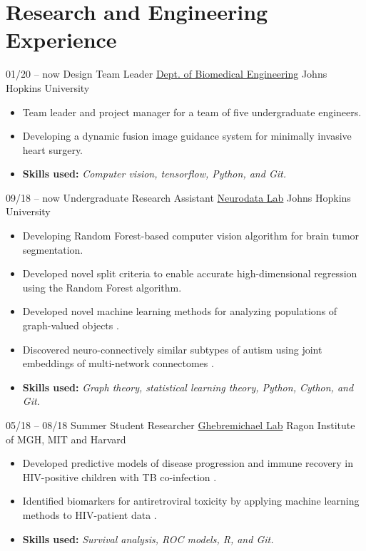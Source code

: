 \section{Research and Engineering Experience}
\cventry
{01/20 -- now}
{Design Team Leader}
{\href{https://cbid.bme.jhu.edu/academics/undergraduate-studies/}{Dept. of Biomedical Engineering}}
{Johns Hopkins University}
{}
{
\begin{itemize}
    \item Team leader and project manager for a team of five undergraduate engineers.
    \item Developing a dynamic fusion image guidance system for minimally invasive heart surgery.
    \item \textbf{Skills used:} \textit{Computer vision, tensorflow, Python, and Git.}
\end{itemize}{}
}

\cventry
{09/18 -- now}
{Undergraduate Research Assistant}
{\href{https://neurodata.io}{Neurodata Lab}}
{Johns Hopkins University}
{}
{
\begin{itemize}
    \item Developing Random Forest-based computer vision algorithm for brain tumor segmentation.
    \item Developed novel split criteria to enable accurate high-dimensional regression using the Random Forest algorithm.
    \item Developed novel machine learning methods for analyzing populations of graph-valued objects \cite{chungStatisticalConnectomics2020b}.
    \item Discovered neuro-connectively similar subtypes of autism using joint embeddings of multi-network connectomes \cite{wangVariabilityHeritabilityMouse2020, gopalakrishnanBMES2019}.
    \item \textbf{Skills used:} \textit{Graph theory, statistical learning theory, Python, Cython, and Git.}
\end{itemize}
}

\cventry
{05/18 -- 08/18}
{Summer Student Researcher}
{\href{http://www.ragoninstitute.org/portfolio-item/ghebremichael/}{Ghebremichael Lab}}
{Ragon Institute of MGH, MIT and Harvard}
{}
{
\begin{itemize}
    \item Developed predictive models of disease progression and immune recovery in HIV-positive children with TB co-infection \cite{gopalakrishnanPreHAARTCD4Tlymphocytes2020}.
    \item Identified biomarkers for antiretroviral toxicity by applying machine learning methods to HIV-patient data \cite{leeComparisonMachineLearning2019a}.
    \item \textbf{Skills used:} \textit{Survival analysis, ROC models, R, and Git.}
\end{itemize}{}
}

